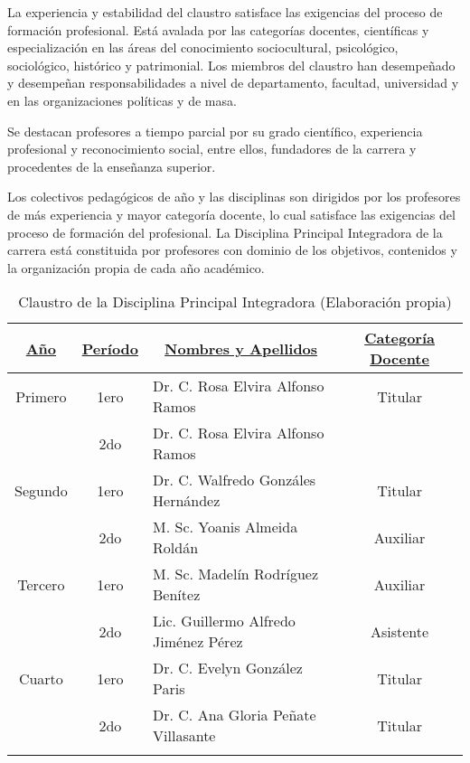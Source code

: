 La experiencia y estabilidad del claustro satisface las exigencias del proceso de formación profesional. Está avalada por las categorías docentes, científicas y especialización en las áreas del conocimiento sociocultural, psicológico, sociológico, histórico y patrimonial. Los miembros del claustro han desempeñado y desempeñan responsabilidades a nivel de departamento, facultad, universidad y en las organizaciones políticas y de masa.

Se destacan profesores a tiempo parcial por su grado científico, experiencia profesional y reconocimiento social, entre ellos, fundadores de la carrera y procedentes de la enseñanza superior.

Los colectivos pedagógicos de año y las disciplinas son dirigidos por los profesores de más experiencia y mayor categoría docente, lo cual satisface las exigencias del proceso de formación del profesional. La Disciplina Principal Integradora de la carrera está constituida por profesores con dominio de los objetivos, contenidos y la organización propia de cada año académico. 

\begin{longtable}{|c|c|p{7cm}|c|}
	
	
	
	\hline
	\underline{\textbf{Año}} &  \underline{\textbf{Período}}& \multicolumn{1}{|c|}{\underline{\textbf{Nombres y Apellidos}}} & \underline{\textbf{Categoría Docente}} \\ \hline
	
	Primero &1ero & Dr. C. Rosa Elvira Alfonso Ramos& Titular \\ \cline{2-3}
	& 2do& Dr. C. Rosa Elvira Alfonso Ramos& \\ \hline
	Segundo& 1ero& Dr. C. Walfredo Gonzáles Hernández& Titular \\ \cline{2-4}
	& 2do& M. Sc. Yoanis Almeida Roldán& Auxiliar\\ \hline
	Tercero& 1ero& M. Sc. Madelín Rodríguez Benítez& Auxiliar\\ \cline{2-4}
	& 2do& Lic. Guillermo Alfredo Jiménez Pérez& Asistente\\ \hline
	Cuarto&1ero & Dr. C. Evelyn González Paris& Titular\\ \cline{2-4}
	& 2do& Dr. C. Ana Gloria Peñate Villasante& Titular\\ \hline

	\caption{Claustro de la Disciplina Principal Integradora (Elaboración propia)}
\end{longtable}


